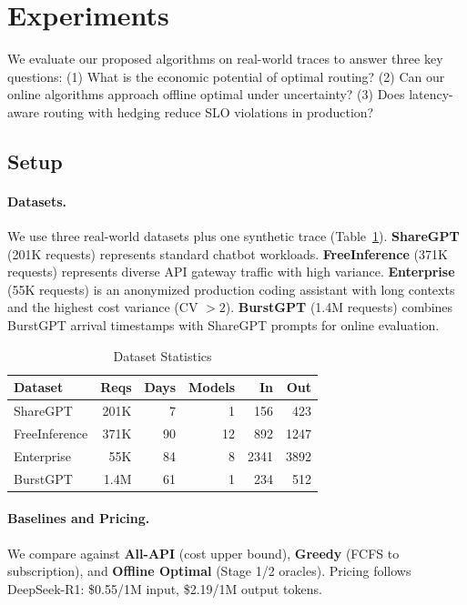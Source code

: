 \section{Experiments}
\label{sec:experiments}

We evaluate our proposed algorithms on real-world traces to answer three key questions: (1) What is the economic potential of optimal routing? (2) Can our online algorithms approach offline optimal under uncertainty? (3) Does latency-aware routing with hedging reduce SLO violations in production?

\subsection{Setup}

\paragraph{Datasets.} We use three real-world datasets plus one synthetic trace (Table~\ref{tab:datasets}). \textbf{ShareGPT} (201K requests) represents standard chatbot workloads. \textbf{FreeInference} (371K requests) represents diverse API gateway traffic with high variance. \textbf{Enterprise} (55K requests) is an anonymized production coding assistant with long contexts and the highest cost variance (CV $> 2$). \textbf{BurstGPT} (1.4M requests) combines BurstGPT arrival timestamps with ShareGPT prompts for online evaluation.

\begin{table}[h]
\caption{Dataset Statistics}
\label{tab:datasets}
\vskip 0.1in
\begin{center}
\begin{small}
\begin{tabular}{@{}lrrrrr@{}}
\toprule
Dataset & Reqs & Days & Models & In & Out \\
\midrule
ShareGPT & 201K & 7 & 1 & 156 & 423 \\
FreeInference & 371K & 90 & 12 & 892 & 1247 \\
Enterprise & 55K & 84 & 8 & 2341 & 3892 \\
BurstGPT & 1.4M & 61 & 1 & 234 & 512 \\
\bottomrule
\end{tabular}
\end{small}
\end{center}
\vskip -0.1in
\end{table}

\paragraph{Baselines and Pricing.} We compare against \textbf{All-API} (cost upper bound), \textbf{Greedy} (FCFS to subscription), and \textbf{Offline Optimal} (Stage 1/2 oracles). Pricing follows DeepSeek-R1: \$0.55/1M input, \$2.19/1M output tokens.

